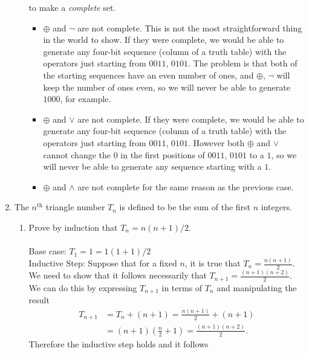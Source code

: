 \documentclass[12pt]{amsart}
\begin{document}
\begin{enumerate}
\begin{enumerate}
    to make a  {\em complete} set.\\
    \begin{itemize}
        \item $\oplus$ and $\neg$ are not complete. This is not the
        most straightforward thing in the world to show. If they
        were complete, we would be able to generate any four-bit
        sequence (column of a truth table) with the operators
        just starting from $0011$, $0101$. The problem is that
        both of the starting sequences have an even number of
        ones, and $\oplus$, $\neg$ will keep the number of ones
        even, so we will never be able to generate $1000$, for
        example.
        \item $\oplus$ and $\vee$ are not complete. If they
        were complete, we would be able to generate any four-bit
        sequence (column of a truth table) with the operators
        just starting from $0011$, $0101$. However both $\oplus$
        and $\vee$ cannot change the $0$ in the first positions of
        $0011$, $0101$ to a
        $1$, so we will never be able to generate any sequence
        starting with a $1$.
        \item $\oplus$ and $\wedge$ are not complete for the same
        reason as the previous case.
    \end{itemize}
    \end{enumerate}
\item
    The  $n^{\mathrm{th}}$ triangle number  $T_{n}$ is defined to be the sum
    of the first  $n$ integers. \\
    \begin{enumerate}
    \item
    Prove by induction that  $T_{n} =  n( n + 1)/2.$ \\
     \\
    Base case: $T_1 = 1 = 1(1 + 1)/2$ \\
    Inductive Step: Suppose that for a fixed $n$, it is true that  $T_n = \frac{n(n+1)}{2}$.
    We need to show that it follows necessarily that $T_{n+1} = \frac{(n+1)(n+2)}{2}$.
    We can do this by expressing $T_{n+1}$ in terms of $T_{n}$ and manipulating the result
    \begin{align*}
        T_{n+1} &= T_n + (n+1) = \frac{n(n+1)}{2} + (n+1) \\
                &= (n+1)(\frac{n}{2} + 1) = \frac{(n+1)(n+2)}{2}.
    \end{align*}
    Therefore the inductive step holds and it follows

\end{enumerate}
\end{enumerate}
\end{document}
